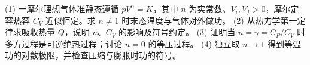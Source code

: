 (1) 一摩尔理想气体准静态遵循 \(pV^n=K\)，其中 \(n\) 为实常数、\(V_i,V_f>0\)，摩尔定容热容 \(C_V\) 近似恒定。求 \(n\ne1\) 时末态温度与气体对外做功。
(2) 从热力学第一定律求吸收热量 \(Q\)，说明 \(n\)、\(C_V\) 的影响及符号约定。
(3) 证明当 \(n=\gamma=C_P/C_V\) 时多方过程是可逆绝热过程；讨论 \(n=0\) 的等压过程。
(4) 独立取 \(n\to1\) 得到等温功的对数极限，并检查压缩与膨胀时功的符号。
